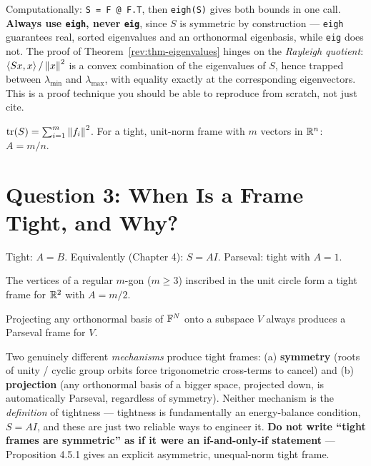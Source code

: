 \begin{reviewbox}
Computationally: \texttt{S = F @ F.T}, then
\texttt{eigh(S)} gives both bounds in one call. \textbf{Always use
\texttt{eigh}, never \texttt{eig}}, since $S$ is symmetric by
construction --- \texttt{eigh} guarantees real, sorted eigenvalues and
an orthonormal eigenbasis, while \texttt{eig} does not.
The proof of Theorem~\ref{rev:thm-eigenvalues} hinges on the
\emph{Rayleigh quotient}: $\left\langle Sx, x \right\rangle/\left\| x \right\|^2$ is a convex
combination of the eigenvalues of $S$, hence trapped between
$\lambda_{\min}$ and $\lambda_{\max}$, with equality exactly at the
corresponding eigenvectors. This is a proof technique you should be
able to reproduce from scratch, not just cite.
\end{reviewbox}

\begin{proposition}
\label{rev:prop-trace}
$\operatorname{tr}(S) = \sum_{i=1}^m\left\| f_i \right\|^2$. For a tight, unit-norm frame with
$m$ vectors in $\mathbb{R}^n$: $A = m/n$.
\end{proposition}

\section{Question 3: When Is a Frame Tight, and Why?}
\label{sec:review-q3}

\begin{definition}
\label{rev:def-tight}
Tight: $A=B$. Equivalently (Chapter 4): $S=AI$. Parseval: tight with
$A=1$.
\end{definition}

\begin{theorem}
\label{rev:thm-polygon}
The vertices of a regular $m$-gon ($m\ge3$) inscribed in the unit
circle form a tight frame for $\mathbb{R}^2$ with $A=m/2$.
\end{theorem}

\begin{theorem}
\label{rev:thm-projection}
Projecting any orthonormal basis of $\mathbb{F}^N$ onto a subspace $V$ always
produces a Parseval frame for $V$.
\end{theorem}

\begin{reviewbox}
Two genuinely different \emph{mechanisms} produce tight frames: (a)
\textbf{symmetry} (roots of unity / cyclic group orbits force
trigonometric cross-terms to cancel) and (b) \textbf{projection} (any
orthonormal basis of a bigger space, projected down, is automatically
Parseval, regardless of symmetry). Neither mechanism is the
\emph{definition} of tightness --- tightness is fundamentally an
energy-balance condition, $S=AI$, and these are just two reliable ways
to engineer it. \textbf{Do not write ``tight frames are symmetric'' as
if it were an if-and-only-if statement} --- Proposition 4.5.1 gives an
explicit asymmetric, unequal-norm tight frame.
\end{reviewbox}

